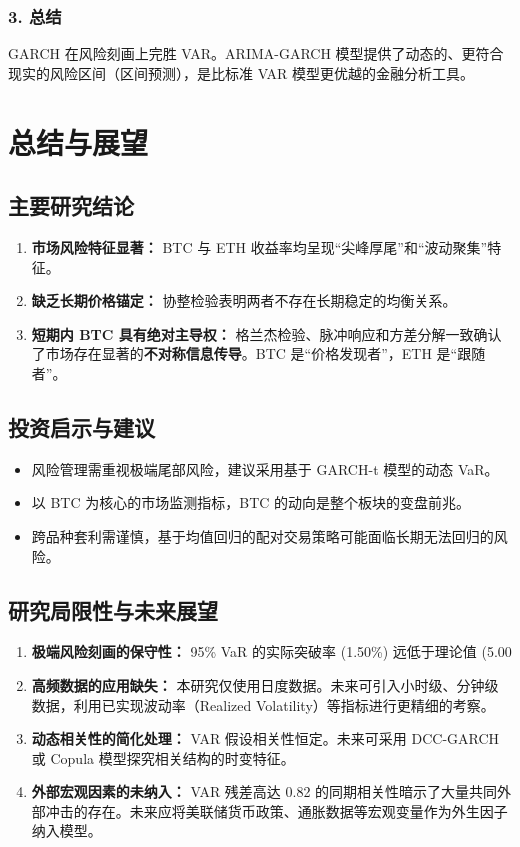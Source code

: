 \documentclass[a4paper]{ctexart}
\begin{document}
	\subsubsection{3. 总结}
	GARCH 在风险刻画上完胜 VAR。ARIMA-GARCH 模型提供了动态的、更符合现实的风险区间（区间预测），是比标准 VAR 模型更优越的金融分析工具。
	
	\section{总结与展望}
	\subsection{主要研究结论}
	\begin{enumerate}
		\item \textbf{市场风险特征显著：} BTC 与 ETH 收益率均呈现“尖峰厚尾”和“波动聚集”特征。
		\item \textbf{缺乏长期价格锚定：} 协整检验表明两者不存在长期稳定的均衡关系。
		\item \textbf{短期内 BTC 具有绝对主导权：} 格兰杰检验、脉冲响应和方差分解一致确认了市场存在显著的\textbf{不对称信息传导}。BTC 是“价格发现者”，ETH 是“跟随者”。
	\end{enumerate}
	
	\subsection{投资启示与建议}
	\begin{itemize}
		\item 风险管理需重视极端尾部风险，建议采用基于 GARCH-t 模型的动态 VaR。
		\item 以 BTC 为核心的市场监测指标，BTC 的动向是整个板块的变盘前兆。
		\item 跨品种套利需谨慎，基于均值回归的配对交易策略可能面临长期无法回归的风险。
	\end{itemize}
	
	\subsection{研究局限性与未来展望}
	\begin{enumerate}
		\item \textbf{极端风险刻画的保守性：} 95\% VaR 的实际突破率 (1.50\%) 远低于理论值 (5.00%
		\item \textbf{高频数据的应用缺失：} 本研究仅使用日度数据。未来可引入小时级、分钟级数据，利用已实现波动率（Realized Volatility）等指标进行更精细的考察。
		\item \textbf{动态相关性的简化处理：} VAR 假设相关性恒定。未来可采用 DCC-GARCH 或 Copula 模型探究相关结构的时变特征。
		\item \textbf{外部宏观因素的未纳入：} VAR 残差高达 0.82 的同期相关性暗示了大量共同外部冲击的存在。未来应将美联储货币政策、通胀数据等宏观变量作为外生因子纳入模型。
	\end{enumerate}
	
\end{document}
